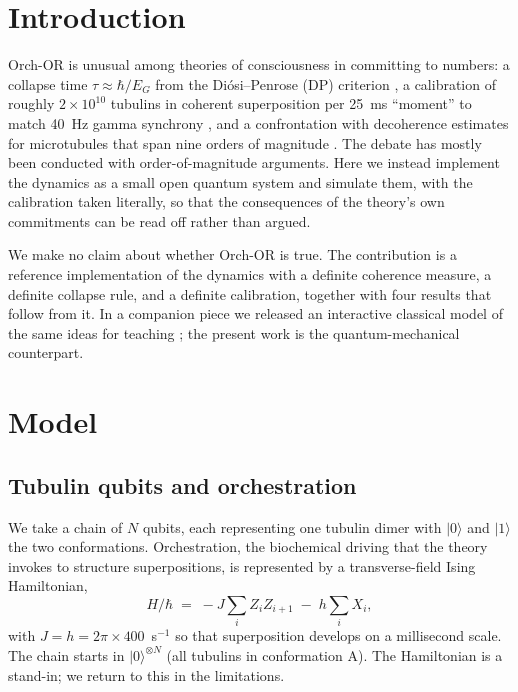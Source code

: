 \documentclass[11pt]{article}
\begin{document}
\section{Introduction}
Orch-OR \citep{penrose1994,hameroff1996,hameroff2014} is unusual among theories of consciousness in committing to numbers: a collapse time $\tau \approx \hbar/E_G$ from the Di\'osi--Penrose (DP) criterion \citep{diosi1989,penrose1996}, a calibration of roughly $2\times10^{10}$ tubulins in coherent superposition per 25~ms ``moment'' to match 40~Hz gamma synchrony \citep{hameroff2014}, and a confrontation with decoherence estimates for microtubules that span nine orders of magnitude \citep{tegmark2000,hagan2002}. The debate has mostly been conducted with order-of-magnitude arguments. Here we instead implement the dynamics as a small open quantum system and simulate them, with the calibration taken literally, so that the consequences of the theory's own commitments can be read off rather than argued.

We make no claim about whether Orch-OR is true. The contribution is a reference implementation of the dynamics with a definite coherence measure, a definite collapse rule, and a definite calibration, together with four results that follow from it. In a companion piece we released an interactive classical model of the same ideas for teaching \citep{seong2026viz}; the present work is the quantum-mechanical counterpart.

\section{Model}
\subsection{Tubulin qubits and orchestration}
We take a chain of $N$ qubits, each representing one tubulin dimer with $|0\rangle$ and $|1\rangle$ the two conformations. Orchestration, the biochemical driving that the theory invokes to structure superpositions, is represented by a transverse-field Ising Hamiltonian,
\begin{equation}
H/\hbar \;=\; -J\sum_{i}Z_iZ_{i+1} \;-\; h\sum_i X_i ,
\label{eq:H}
\end{equation}
with $J=h=2\pi\times400$~s$^{-1}$ so that superposition develops on a millisecond scale. The chain starts in $|0\rangle^{\otimes N}$ (all tubulins in conformation A). The Hamiltonian is a stand-in; we return to this in the limitations.
\end{document}
